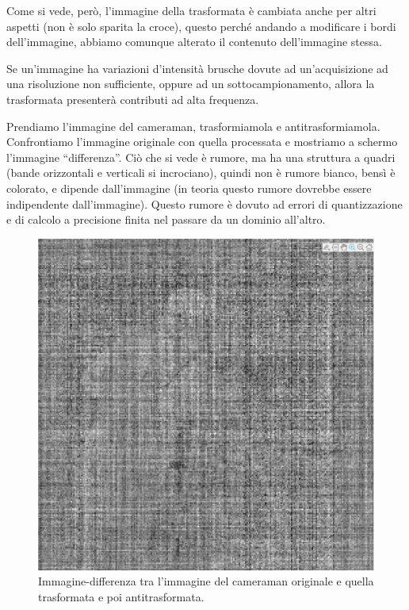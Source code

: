 \documentclass[a4paper,11pt]{article}
\begin{document}
Come si vede, però, l'immagine della trasformata è cambiata anche per altri aspetti (non è solo sparita la croce), questo perché
andando a modificare i bordi dell'immagine, abbiamo comunque alterato il contenuto dell'immagine stessa.
\par
Se un'immagine ha variazioni d'intensità brusche dovute ad un'acquisizione ad una risoluzione non sufficiente, oppure ad un sottocampionamento,
allora la trasformata presenterà contributi ad alta frequenza.
\par
Prendiamo l'immagine del cameraman, trasformiamola e antitrasformiamola. Confrontiamo l'immagine originale con quella processata e
mostriamo a schermo l'immagine ``differenza''. Ciò che si vede è rumore, ma ha una struttura a quadri (bande orizzontali e verticali si incrociano),
quindi non è rumore bianco, bensì è colorato, e dipende dall'immagine (in teoria questo rumore dovrebbe essere indipendente dall'immagine).
Questo rumore è dovuto ad errori di quantizzazione e di calcolo a precisione finita nel passare da un dominio all'altro.

\renewcommand{\thefigure}{6.2}
\begin{figure}[!h]
  \centering
    \includegraphics[scale=0.4]{images/6/cameraman_difference.png}
    \caption{Immagine-differenza tra l'immagine del cameraman originale e quella trasformata e poi antitrasformata.}
\end{figure}
\end{document}
